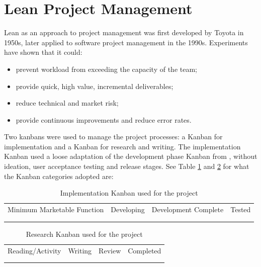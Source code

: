 \section{Lean Project Management}

Lean as an approach to project management was first developed by Toyota in 1950s, later 
applied to software project management in the 1990s. Experiments have shown that it could: 

\begin{itemize}
    \setlength\itemsep{0em}    
    \item prevent workload from exceeding the capacity of the team;
    \item provide quick, high value, incremental deliverables;
    \item reduce technical and market risk;
    \item provide continuous improvements and reduce error rates. \\
    \citep[p.30]{middleton2012lean}
\end{itemize}

Two kanbans were used to manage the project processes: a Kanban for implementation and 
a Kanban for research and writing. The implementation Kanban used
a loose adaptation of the development phase Kanban from \citet[p.25]{middleton2012lean}, 
without ideation, user acceptance testing and release stages.
See Table \ref{table:kanban-implementation} and \ref{table:kanban-research} for what the Kanban categories adopted are:
\\
\begin{table}[!ht] 
    \caption{Implementation Kanban used for the project}
    \centering
    \label{table:kanban-implementation}
    \begin{tabular}{|c|c|c|c|}
        \hline
        Minimum Marketable Function & Developing & Development Complete & Tested \\
        &&&\\
        &&&\\
        \hline
    \end{tabular}
\end{table}
\begin{table}[!ht] 
    \caption{Research Kanban used for the project}
    \centering
    \label{table:kanban-research}
    \begin{tabular}{|c|c|c|c|}
        \hline
        Reading/Activity & Writing & Review & Completed\\
        &&&\\
        &&&\\        
        \hline
    \end{tabular}
\end{table}

